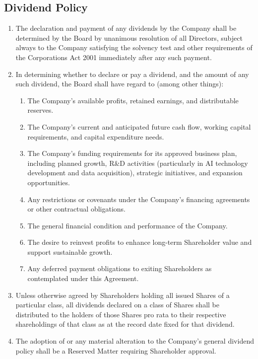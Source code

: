 \subsection{Dividend Policy} \label{subsec:DividendPolicy}
\begin{enumerate}[label=(\alph*)]
\item The declaration and payment of any dividends by the Company shall be determined by the Board by unanimous resolution of all Directors, subject always to the Company satisfying the solvency test and other requirements of the Corporations Act 2001 immediately after any such payment.
\item In determining whether to declare or pay a dividend, and the amount of any such dividend, the Board shall have regard to (among other things):
    \begin{enumerate}[label=(\roman*)]
    \item The Company's available profits, retained earnings, and distributable reserves.
    \item The Company's current and anticipated future cash flow, working capital requirements, and capital expenditure needs.
    \item The Company's funding requirements for its approved business plan, including planned growth, R\&D activities (particularly in AI technology development and data acquisition), strategic initiatives, and expansion opportunities.
    \item Any restrictions or covenants under the Company's financing agreements or other contractual obligations.
    \item The general financial condition and performance of the Company.
    \item The desire to reinvest profits to enhance long-term Shareholder value and support sustainable growth.
    \item Any deferred payment obligations to exiting Shareholders as contemplated under this Agreement.
    \end{enumerate}
\item Unless otherwise agreed by Shareholders holding all issued Shares of a particular class, all dividends declared on a class of Shares shall be distributed to the holders of those Shares pro rata to their respective shareholdings of that class as at the record date fixed for that dividend.
\item The adoption of or any material alteration to the Company's general dividend policy shall be a Reserved Matter requiring Shareholder approval.
\end{enumerate}

